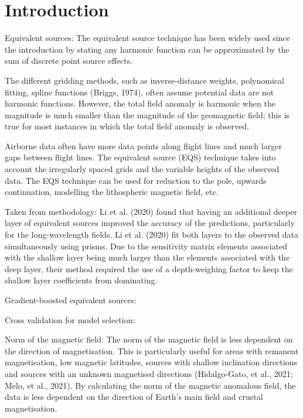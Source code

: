 
\section{Introduction}

Equivalent sources:
The equivalent source technique has been widely used since the introduction by \citet{Dampney1969} stating any harmonic function can be approximated by the sum of discrete point source effects.

The different gridding methods, such as inverse-distance weights, polynomical fitting, spline functions (Briggs, 1974), often assume potential data are not harmonic functions. However, the total field anomaly is harmonic when the magnitude is much smaller than the magnitude of the geomagnetic field; this is true for most instances in which the total field anomaly is observed. 

Airborne data often have more data points along flight lines and much larger gaps between flight lines. The equivalent source (EQS) technique takes into account the irregularly spaced grids and the variable heights of the observed data. The EQS technique can be used for reduction to the pole, upwards continuation, modelling the lithospheric magnetic field, etc.

Taken from methodology:
Li et al. (2020) found that having an additional deeper layer of equivalent sources improved the accuracy of the predictions, particularly for the long-wavelength fields. Li et al. (2020) fit both layers to the observed data simultaneously using prisms. Due to the sensitivity matrix elements associated with the shallow layer being much larger than the elements associated with the deep layer, their method required the use of a depth-weighing factor to keep the shallow layer coefficients from dominating.

Gradient-boosted equivalent sources:

Cross validation for model selection:

Norm of the magnetic field:
The norm of the magnetic field is less dependent on the direction of magnetisation. This is particularly useful for areas with remanent magnetisation, low magnetic latitudes, sources with shallow inclination directions and sources with an unknown magnetised directions (Hidalgo-Gato, et al., 2021; Melo, et al., 2021). By calculating the norm of the magnetic anomalous field, the data is less dependent on the direction of Earth’s main field and crustal magnetisation.

